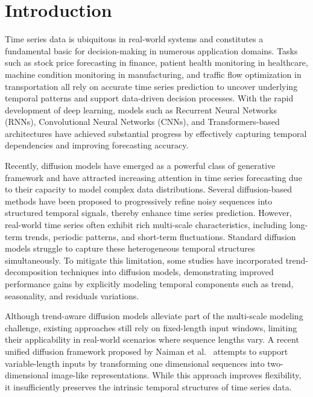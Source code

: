 \section{Introduction}

Time series data is ubiquitous in real-world systems and constitutes a fundamental basic for decision-making in numerous application domains. 
Tasks such as stock price forecasting in finance, patient health monitoring in healthcare, machine condition monitoring in manufacturing, and traffic flow optimization in transportation all rely on accurate time series prediction to uncover underlying temporal patterns and support data-driven decision processes. 
With the rapid development of deep learning, models such as Recurrent Neural Networks (RNNs), Convolutional Neural Networks (CNNs), and Transformers-based architectures have achieved substantial progress by effectively capturing temporal dependencies and improving forecasting accuracy. 

Recently, diffusion models have emerged as a powerful class of generative framework and have attracted increasing attention in time series forecasting due to their capacity to model complex data distributions. 
Several diffusion-based methods have been proposed to progressively refine noisy sequences into structured temporal signals, thereby enhance time series prediction. 
However, real-world time series often exhibit rich multi-scale characteristics, including long-term trends, periodic patterns, and short-term fluctuations. 
Standard diffusion models struggle to capture these heterogeneous temporal structures simultaneously. 
To mitigate this limitation, some studies have incorporated trend-decomposition techniques into diffusion models, demonstrating improved performance gains by explicitly modeling temporal components such as trend, seasonality, and residuals variations.  

Although trend-aware diffusion models alleviate part of the multi-scale modeling challenge, existing approaches still rely on fixed-length input windows, limiting their applicability in real-world scenarios where sequence lengths vary. 
A recent unified diffusion framework proposed by Naiman et al.~\cite{naiman_utilizing_nodate} attempts to support variable-length inputs by transforming one dimensional sequences into two-dimensional image-like representations. 
While this approach improves flexibility, it insufficiently preserves the intrinsic temporal structures of time series data.  

